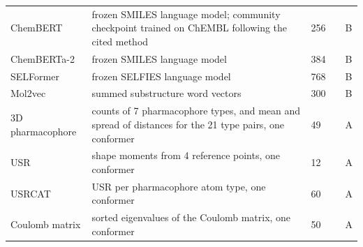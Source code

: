 {\begin{longtable}{P{3.0cm}P{5.0cm}P{1.5cm}P{1.5cm}P{1.4cm}}
ChemBERT & frozen SMILES language model; community checkpoint trained on ChEMBL following the cited method & 256 & \citep{Zhang2022ChemBERT} & B \\
ChemBERTa-2 & frozen SMILES language model & 384 & \citep{Ahmad2022} & B \\
SELFormer & frozen SELFIES language model & 768 & \citep{Yuksel2023} & B \\
Mol2vec & summed substructure word vectors & 300 & \citep{Jaeger2018} & B \\
3D pharmacophore & counts of 7 pharmacophore types, and mean and spread of distances for the 21 type pairs, one conformer & 49 & \citep{rdkit} & A \\
USR & shape moments from 4 reference points, one conformer & 12 & \citep{Ballester2007} & A \\
USRCAT & USR per pharmacophore atom type, one conformer & 60 & \citep{Schreyer2012} & A \\
Coulomb matrix & sorted eigenvalues of the Coulomb matrix, one conformer & 50 & \citep{Rupp2012} & A \\
\end{longtable}}

